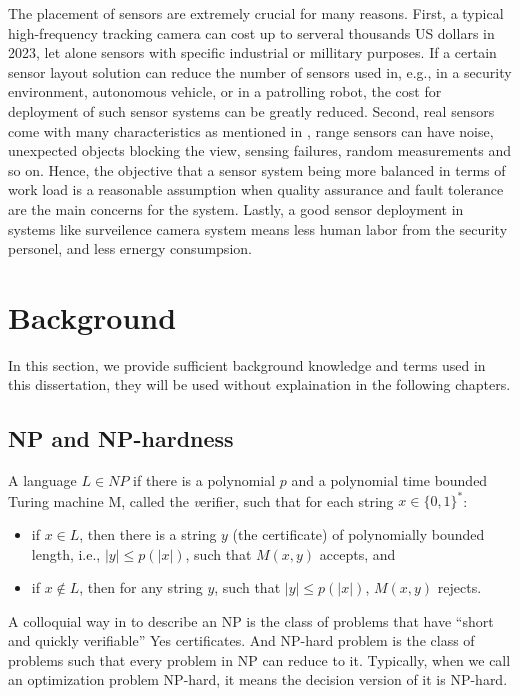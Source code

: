 The placement of sensors are extremely crucial for many reasons.
First, a typical high-frequency tracking camera can cost up to serveral thousands US dollars in 2023, 
let alone sensors with specific industrial or millitary purposes. If a certain sensor layout solution
can reduce the number of sensors used in, e.g., in a security environment, autonomous vehicle, or in a patrolling robot,
the cost for deployment of such sensor systems can be greatly reduced.
Second, real sensors come with many characteristics as mentioned in \cite{sebastian2005prob},
range sensors can have noise, unexpected objects blocking the view, sensing failures, random measurements and so on.
Hence, the objective that a sensor system being more balanced in terms of work load is a reasonable assumption
when quality assurance and fault tolerance are the main concerns for the system. 
Lastly, a good sensor deployment in systems like surveilence camera system means less human labor from the security personel,
and less ernergy consumpsion.
\section{Background}
In this section, we provide sufficient background knowledge and terms used in this dissertation, 
they will be used without explaination in the following chapters. 

\subsection{NP and NP-hardness}
\begin{definition}
    A language $L\in NP$ if there is a polynomial $p$ and a polynomial time bounded Turing machine M, 
    called the {\textit verifier}, such that for each string $x\in \{0, 1\}^*$: 
    \begin{itemize}
        \item if $x\in L$, then there is a string $y$ (the certificate) of polynomially bounded length, i.e., $|y| \leq p(|x|)$,
        such that $M(x, y)$ accepts, and 
        \item if $x\notin L$, then for any string $y$, such that $|y|\leq p(|x|)$, $M(x,y)$ rejects.
    \end{itemize}
\end{definition}

A colloquial way in \cite{vazirani2001approximation} to describe an NP is the class of problems that have ``short and quickly verifiable'' 
Yes certificates.
And NP-hard problem is the class of problems such that every problem in NP can reduce to it.
Typically, when we call an optimization problem NP-hard, it means the decision version of it is NP-hard.
